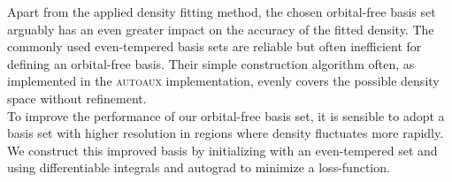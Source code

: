 Apart from the applied density fitting method, the chosen orbital-free basis set arguably has an even greater impact on the accuracy of the fitted density. The commonly used even-tempered basis sets are reliable but often inefficient for defining an orbital-free basis. Their simple construction algorithm often, as implemented in the \textsc{autoaux}\cite{autoaux} implementation, evenly covers the possible density space without refinement.\\

To improve the performance of our orbital-free basis set, it is sensible to adopt a basis set with higher resolution in regions where density fluctuates more rapidly. \\We construct this improved basis by initializing with an even-tempered set and using differentiable integrals and autograd to minimize a loss-function.

